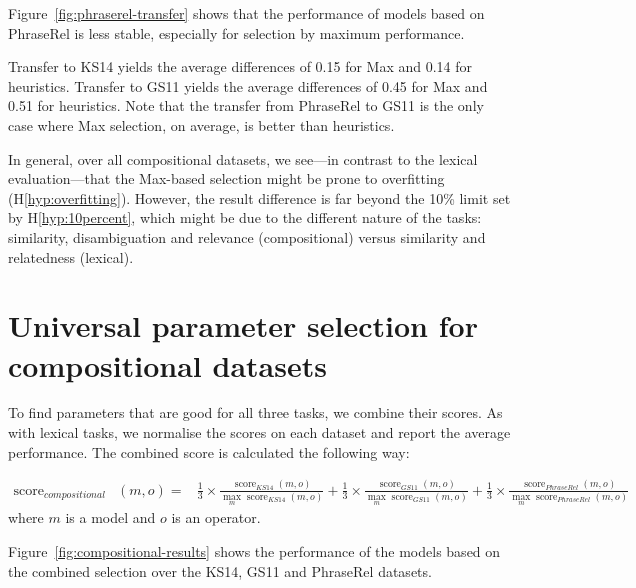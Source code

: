 

Figure~\ref{fig:phraserel-transfer} shows that the performance of models based on PhraseRel is less stable, especially for selection by maximum performance.

Transfer to KS14 yields the average differences of 0.15 for Max and 0.14 for heuristics. Transfer to GS11 yields the average differences of 0.45 for Max and 0.51 for heuristics. Note that the transfer from PhraseRel to GS11 is the only case where Max selection, on average, is better than heuristics.

In general, over all compositional datasets, we see---in contrast to the lexical evaluation---that the Max-based selection might be prone to overfitting (H\ref{hyp:overfitting}). However, the result difference is far beyond the 10\% limit set by H\ref{hyp:10percent}, which might be due to the different nature of the tasks: similarity, disambiguation and relevance (compositional) versus similarity and relatedness (lexical).

\section{Universal parameter selection for compositional datasets}
\label{sec:robust-param-comp-selecion}

To find parameters that are good for all three tasks, we combine their scores. As with lexical tasks, we normalise the scores on each dataset and report the average performance. The combined score is calculated the following way:

{
\scriptsize
\begin{align}
\operatorname{score}_\mathit{compositional}&(\mathit{m}, \mathit{o}) =
&\frac{1}{3}\times%
\frac{\operatorname{score}_\mathit{KS14}(\mathit{m}, \mathit{o})}%
{\max_m\operatorname{score}_\mathit{KS14}(m, \mathit{o})}%
+%
\frac{1}{3}\times%
\frac{\operatorname{score}_\mathit{GS11}(\mathit{m}, \mathit{o})}%
{\max_m\operatorname{score}_\mathit{GS11}(m, \mathit{o})}%
+%
\frac{1}{3}\times%
\frac{\operatorname{score}_\mathit{PhraseRel}(\mathit{m, \mathit{o}})}%
{\max_m\operatorname{score}_\mathit{PhraseRel}(m, \mathit{o})}%
\end{align}
}
where $m$ is a model and $o$ is an operator.

Figure~\ref{fig:compositional-results} shows the performance of the models based on the combined selection over the KS14, GS11 and PhraseRel datasets.

